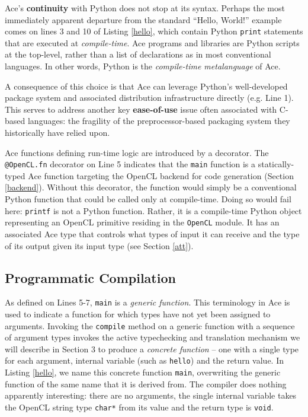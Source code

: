 \documentclass{sig-alternate}
\begin{document}


Ace's \textbf{continuity} with Python does not stop at its syntax. 
Perhaps the most immediately apparent departure from the standard ``Hello, World!'' example comes on lines 3 and 10 of Listing \ref{hello}, which contain Python \verb|print| statements that are executed at {\em compile-time}.  Ace programs and libraries are Python scripts at the top-level, rather than a list of declarations as in most conventional languages. In other words, Python is the {\em compile-time metalanguage} of Ace. 

A consequence of this choice is that Ace can leverage Python's well-developed package system and associated distribution infrastructure directly (e.g. Line 1). This serves to address another key \textbf{ease-of-use} issue often associated with C-based languages: the fragility of the preprocessor-based packaging system they historically have relied upon. 

Ace functions defining run-time logic are introduced by a decorator. The \verb|@OpenCL.fn| decorator on Line 5 indicates that the \verb|main| function is a statically-typed Ace function targeting the OpenCL backend for code generation (Section \ref{backend}). Without this decorator, the function would simply be a conventional Python function that could be called only at compile-time. Doing so would fail here: \verb|printf| is not a Python function. Rather, it is a compile-time Python object representing an OpenCL primitive residing in the \verb|OpenCL| module. It has an associated Ace type that controls what types of input it can receive and the type of its output given its input type (see Section \ref{att}).

\subsection{Programmatic Compilation}
As defined on Lines 5-7, \verb|main| is a \emph{generic function}. This terminology in Ace is used to indicate a function for which types have not yet been assigned to arguments. Invoking the \verb|compile| method on a generic function with a sequence of argument types invokes the active typechecking and translation mechanism we will describe in Section 3 to produce a \emph{concrete function} -- one with a single type for each argument, internal variable (such as \verb|hello|) and the return value. In Listing \ref{hello}, we name this concrete function \verb|main|, overwriting the generic function of the same name that it is derived from. The compiler does nothing apparently interesting: there are no arguments, the single internal variable takes the OpenCL string type \verb|char*| from its value and the return type is \verb|void|. 
\end{document}
